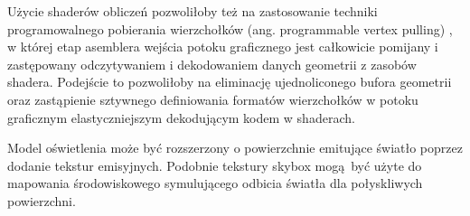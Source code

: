 Użycie shaderów obliczeń pozwoliłoby też na zastosowanie techniki programowalnego pobierania wierzchołków (ang. programmable vertex pulling) \cite{kosarevsky20213d}, w której etap asemblera wejścia potoku graficznego jest całkowicie pomijany i zastępowany odczytywaniem i dekodowaniem danych geometrii z zasobów shadera.
Podejście to pozwoliłoby na eliminację ujednoliconego bufora geometrii oraz zastąpienie sztywnego definiowania formatów wierzchołków w potoku graficznym elastyczniejszym dekodującym kodem w shaderach. 

Model oświetlenia może być rozszerzony o powierzchnie emitujące światło poprzez dodanie tekstur emisyjnych.
Podobnie tekstury skybox mogą być użyte do mapowania środowiskowego symulującego odbicia światła dla połyskliwych powierzchni.
